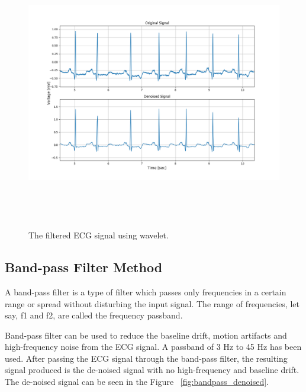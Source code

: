 \begin{figure}[htpb]
	\centering
	\includegraphics[width=15cm,height=12cm,keepaspectratio=true]{images/wavelet_denoised_1}
	\caption{
		The filtered ECG signal using wavelet.
	}
	\label{fig:wavelet_denoised}
\end{figure}


\subsection{Band-pass Filter Method}
A band-pass filter is a type of filter which passes only frequencies in a certain range or spread without disturbing the input signal. The range of frequencies, let say, f1 and f2, are called the frequency passband.

Band-pass filter can be used to reduce the baseline drift, motion artifacts and high-frequency noise from the ECG signal. A passband of 3 Hz to 45 Hz has been used. After passing the ECG signal through the band-pass filter, the resulting signal produced is the de-noised signal with no high-frequency and baseline drift. The de-noised signal can be seen in the Figure ~\ref{fig:bandpass_denoised}. 

